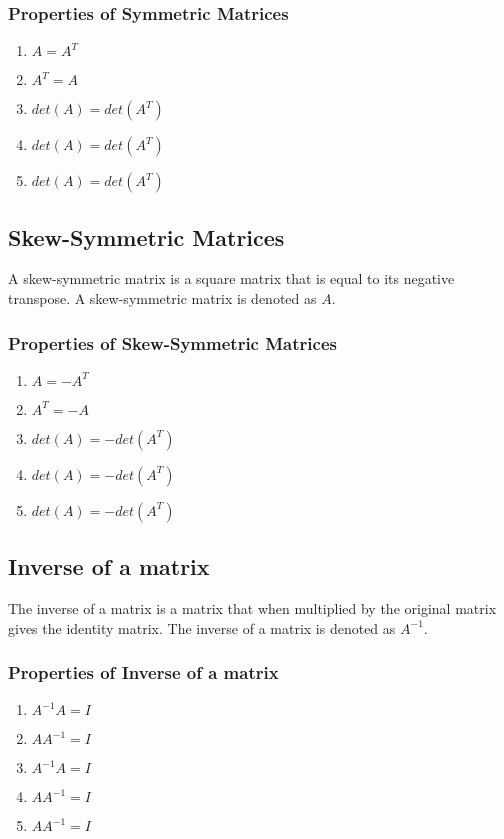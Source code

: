\documentclass[titlepage,a4paper]{article}
\begin{document}
		\subsubsection{Properties of Symmetric Matrices}
			\begin{enumerate}
				\item $A = A^T$
				\item $A^T = A$
				\item $det(A) = det(A^T)$
				\item $det(A) = det(A^T)$
				\item $det(A) = det(A^T)$
			\end{enumerate}
	\subsection{Skew-Symmetric Matrices}
		A skew-symmetric matrix is a square matrix that is equal to its negative transpose. A skew-symmetric matrix is denoted as $A$.
		\subsubsection{Properties of Skew-Symmetric Matrices}
			\begin{enumerate}
				\item $A = -A^T$
				\item $A^T = -A$
				\item $det(A) = -det(A^T)$
				\item $det(A) = -det(A^T)$
				\item $det(A) = -det(A^T)$
			\end{enumerate}
	\subsection{Inverse of a matrix}
		The inverse of a matrix is a matrix that when multiplied by the original matrix gives the identity matrix. The inverse of a matrix is denoted as $A^{-1}$.
		\subsubsection{Properties of Inverse of a matrix}
			\begin{enumerate}
				\item $A^{-1}A=I$
				\item $AA^{-1}=I$
				\item $A^{-1}A=I$
				\item $AA^{-1}=I$
				\item $AA^{-1}=I$
			\end{enumerate}
\end{document}
